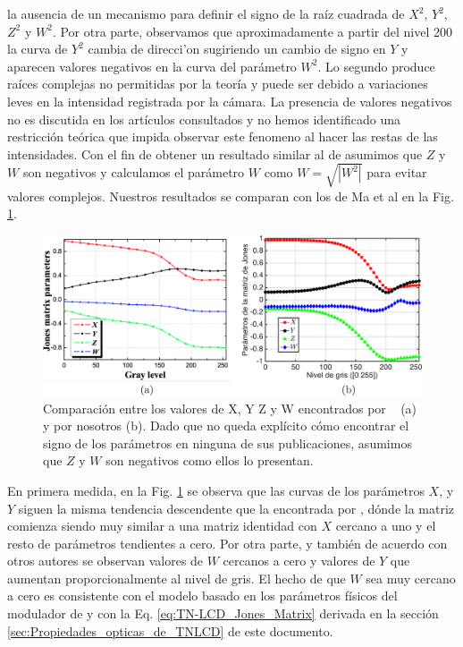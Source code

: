 la ausencia de un mecanismo para definir el signo de la raíz
cuadrada de $X^2$, $Y^2$, $Z^2$ y $W^2$. Por otra parte, observamos
que aproximadamente a partir del nivel 200 la curva de $Y^2$ cambia de
direcci'on sugiriendo un cambio de signo en $Y$ y aparecen valores negativos
en la curva del parámetro $W^2$. Lo segundo produce raíces complejas no
permitidas por la teoría y puede ser debido a variaciones leves
en la intensidad registrada por la cámara. La presencia de
valores negativos no es discutida en los artículos consultados y no
hemos identificado una restricción teórica que impida observar este
fenomeno al hacer las restas de las intensidades. Con el fin de
obtener un resultado similar al de  asumimos
  que $Z$ y $W$ son negativos y calculamos el parámetro $W$ como
  $W=\sqrt{|W^2|}$ para evitar valores complejos. Nuestros
  resultados se comparan con los de Ma et al en la Fig. \ref{fig:Ma_and_our_XYZW}.
\begin{figure}[h!]
\includegraphics[scale = .26]{Ma_and_our_XYZW.pdf}
\caption[Comparación entre los valores de $X$, $Y$ $Z$ y $W$ encontrados por
Ma et al.~ para un SLM similar y por nosotros.]{Comparación entre los
  valores de X, Y Z y W encontrados por ~ 
  (a) y por nosotros (b). Dado que no queda explícito cómo encontrar
  el signo de los parámetros en ninguna de sus publicaciones, asumimos
  que $Z$ y $W$ son negativos como ellos lo presentan.}   
\label{fig:Ma_and_our_XYZW}
\end{figure}
En primera medida, en la Fig. \ref{fig:Ma_and_our_XYZW} se observa que
las curvas de los parámetros $X$, y 
$Y$ siguen la misma tendencia descendente que la encontrada por
, dónde la matriz comienza siendo muy similar a
una matriz identidad con $X$ cercano a uno y el resto de parámetros
tendientes a cero. Por otra parte, y también de acuerdo con otros
autores  se observan valores de $W$
cercanos a cero y valores de $Y$ 
que aumentan proporcionalmente al nivel de gris. El hecho de que $W$
sea muy cercano a cero es consistente con el modelo basado en los
parámetros físicos del modulador de
 y con la
Eq. \ref{eq:TN-LCD_Jones_Matrix} derivada en la sección
\ref{sec:Propiedades_opticas_de_TNLCD} de este documento. 

